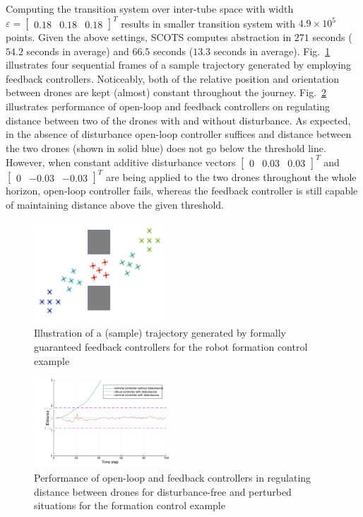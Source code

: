 Computing the transition system over inter-tube space with width $\varepsilon=\begin{bmatrix}0.18&0.18&0.18\end{bmatrix}^T$ results in smaller transition system with $4.9\times 10^5$ points. Given the above settings, SCOTS computes abstraction in $271$ seconds ($54.2$ seconds in average) and $66.5$ seconds ($13.3$ seconds in average). Fig.~\ref{fig:formation_ex} illustrates four sequential frames of a sample trajectory generated by employing feedback controllers. Noticeably, both of the relative position and orientation between drones are kept (almost) constant throughout the journey. Fig.~\ref{fig:formation_distance} illustrates performance of open-loop and feedback controllers on regulating distance between two of the drones with and without disturbance. As expected, in the absence of disturbance open-loop controller suffices and distance between the two drones (shown in solid blue) does not go below the threshold line. However, when constant additive disturbance vectors $\begin{bmatrix}0 &0.03&0.03\end{bmatrix}^T$ and $\begin{bmatrix}0 &-0.03&-0.03\end{bmatrix}^T$ are being applied to the two drones throughout the whole horizon, open-loop controller fails, %
whereas the feedback controller is still capable of maintaining distance above the given threshold.

 \begin{figure}[t]
	\centering
	\includegraphics[width=0.45\textwidth]{figures/formation.pdf}
	\caption{Illustration of a (sample) trajectory generated by formally guaranteed feedback controllers for the robot formation control example}
	\label{fig:formation_ex}
\end{figure}

\begin{figure}[t]
	\centering
	\includegraphics[width=0.45\textwidth]{figures/dist_formation.pdf}
	\caption{Performance of open-loop and feedback controllers in regulating distance between drones for disturbance-free and perturbed situations for the formation control example}
	\label{fig:formation_distance}
\end{figure}
 

